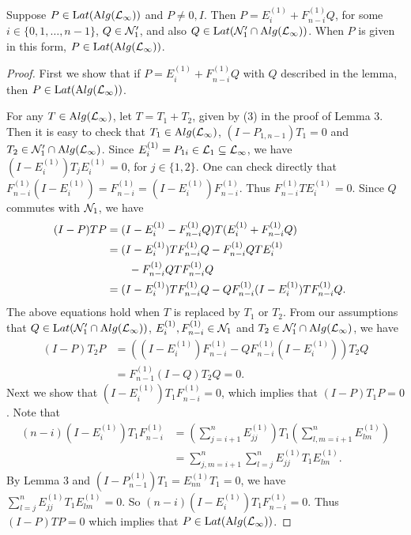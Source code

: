 \vskip6pt

\begin{lemma}
Suppose $P \in
\mathrm Lat(\mathrm Alg(\mathcal L_\infty))$ and $P \neq 0, I$. Then $P = E_{i}^{(1)} +
F_{n-i}^{(1)}Q$, for some  $i \in \{0,1,\ldots, n-1 \}$, $Q \in
{\mathcal N}_{1}'$, and also $Q \in \mathrm Lat(\mathcal N_{1}' \cap
\mathrm Alg(\mathcal L_\infty))$. When $P$ is given in this form,
$P\in\mathrm Lat(\mathrm Alg(\mathcal L_\infty))$.
\end{lemma}

\vskip6pt

\begin{proof}
First we show that if $P =
E_{i}^{(1)} + F_{n-i}^{(1)}Q$ with $Q$ described in the lemma,
then $P \in \mathrm Lat(\mathrm Alg(\mathcal L_\infty))$.

For any $T\in\mathrm Alg(\mathcal L_\infty)$, let $T=T_1+T_2$, given by (3) in
the proof of Lemma 3. Then it is easy to check that $T_{1} \in
\mathrm Alg(\mathcal L_\infty)$, $(I - P_{1,n-1})T_{1} = 0$ and $T_{2} \in
\mathcal N_1' \cap \mathrm Alg(\mathcal L_\infty)$. Since
$E_{i}^{(1)}=P_{1i}\in\mathcal L_1\subseteq\mathcal L_\infty$, we have $(I -
E_{i}^{(1)})T_jE_{i}^{(1)} = 0$, for $j\in\{1,2\}$. One can check
directly that $F_{n-i}^{(1)}(I-E_{i}^{(1)}) =
F_{n-i}^{(1)}=(I-E_i^{(1)})F_{n-i}^{(1)}$. Thus
$F_{n-i}^{(1)}TE_i^{(1)}=0$. Since $Q$ commutes with $\mathcal N_1$, we
have
\begin{align*}
(I-P)TP &= (I - E_{i}^{(1)} - F_{n-i}^{(1)}Q)T(E_{i}^{(1)} +
F_{n-i}^{(1)}Q)
 \cr &= (I-E_{i}^{(1)})TF_{n-i}^{(1)}Q -
F_{n-i}^{(1)}QTE_{i}^{(1)}  \cr & \qquad- F_{n-i}^{(1)}QTF_{n-i}^{(1)}Q
\cr
 & =(I-E_{i}^{(1)})TF_{n-i}^{(1)}Q -
        QF_{n-i}^{(1)}(I-E_{i}^{(1)})TF_{n-i}^{(1)}Q.
\end{align*}
 The above equations hold when $T$ is replaced by $T_1$ or $T_2$. From
our assumptions that $Q \in \mathrm Lat(\mathcal N_{1}' \cap
\mathrm Alg(\mathcal L_\infty))$, $E_i^{(1)}, F_{n-i}^{(1)}\in\mathcal N_1$ and $T_2\in
\mathcal N_1'\cap\mathrm Alg(\mathcal L_\infty)$, we have
\begin{align*}
(I-P)T_{2}P
&=((I-E_i^{(1)})F_{n-i}^{(1)}-QF_{n-i}^{(1)}(I-E_i^{(1)}))T_2Q \\
&=
F_{n-1}^{(1)}(I - Q)T_{2}Q = 0.
\end{align*}
Next we show that
$(I-E_i^{(1)})T_1F_{n-i}^{(1)} = 0$, which implies that
$(I-P)T_1P=0$. Note that
\begin{align*}
(n-i)(I-E_{i}^{(1)})T_1 F_{n-i}^{(1)} &= (\sum_{j= i+1}^{n}
E_{jj}^{(1)})T_{1}(\sum_{l,m = i+1}^{n} E_{lm}^{(1)})\\
&=\sum_{j,m =
i+1}^{n}\sum_{l = j}^{n} E_{jj}^{(1)}T_{1}E_{lm}^{(1)}.
\end{align*}
By Lemma 3 and $(I - P_{n-1}^{(1)})T_{1} = E_{nn}^{(1)}T_{1} =
0$, we have $\sum_{l= j}^{n} E_{jj}^{(1)}T_{1}E_{lm}^{(1)} = 0$.
So $(n-i)(I-E_{i}^{(1)})T_{1}F_{n-i}^{(1)} = 0$. Thus $(I-P)TP=0$
which implies that $P \in \mathrm Lat(\mathrm Alg(\mathcal L_\infty))$.


\end{proof}

